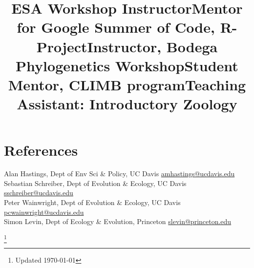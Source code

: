 \documentclass[margin]{res}
\begin{document}
\begin{resume}
\title{ESA Workshop Instructor}
\begin{position}  
  \vspace{-.5cm}
\end{position}

\title{Mentor for Google Summer of Code, R-Project}
\begin{position}
  \vspace{-.5cm}
\end{position}

\title{Instructor, Bodega Phylogenetics Workshop}
\begin{position}
  \vspace{-.5cm}
\end{position}


\title{Student Mentor, CLIMB program}
\begin{position}
  \vspace{-.5cm}
\end{position}

\title{Teaching Assistant: Introductory Zoology}
\begin{position}
  \vspace{-.5cm}
\end{position}





\section{References}

Alan Hastings, Dept of Env Sci \& Policy, UC Davis \href{mailto:amhastings@ucdavis.edu}{amhastings@ucdavis.edu} \\ 
Sebastian Schreiber, Dept of Evolution \& Ecology, UC Davis \href{mailto:sschreiber@ucdavis.edu}{sschreiber@ucdavis.edu} \\
Peter Wainwright, Dept of Evolution \& Ecology, UC Davis \href{mailto:pcwainwright@ucdavis.edu}{pcwainwright@ucdavis.edu} \\
Simon Levin, Dept of Ecology \& Evolution, Princeton \href{mailto:slevin@princeton.edu}{slevin@princeton.edu}

\end{resume}
\let\thefootnote\relax\footnote{Updated \today}
\end{document}
